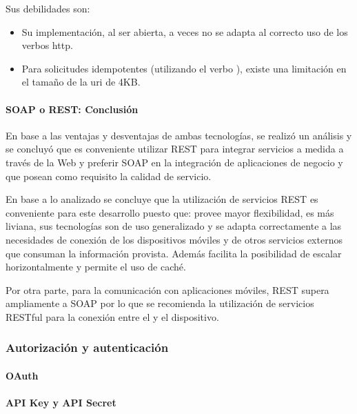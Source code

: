Sus debilidades son:
\begin{itemize}
\item Su implementación, al ser abierta, a veces no se adapta al correcto uso de los verbos \gls{http}.
\item Para solicitudes idempotentes (utilizando el verbo ), existe una limitación en el tamaño de la \gls{uri} de 4KB.
\end{itemize}

\paragraph{SOAP o REST: Conclusión}
\label{soap_vs_rest}

En base a las ventajas y desventajas de ambas tecnologías, se realizó un análisis\cite[p.~809]{pautasso2008restful} y se concluyó que es conveniente utilizar REST para integrar servicios a medida a través de la Web y preferir SOAP en la integración de aplicaciones de negocio y que posean como requisito la calidad de servicio.

En base a lo analizado se concluye que la utilización de servicios REST es conveniente para este desarrollo puesto que: provee mayor flexibilidad, es más liviana, sus tecnologías son de uso generalizado y se adapta correctamente a las necesidades de conexión de los dispositivos móviles y de otros servicios externos que consuman la información provista. Además facilita la posibilidad de escalar horizontalmente y permite el uso de caché.

Por otra parte, para la comunicación con aplicaciones móviles, REST supera ampliamente a SOAP por lo que se recomienda la utilización de servicios RESTful\cite{hamad2010performance} para la conexión entre el  y el dispositivo.

\subsubsection{Autorización y autenticación}
\label{autorizacion_autenticacion}

\paragraph{OAuth}
\label{oauth}

\paragraph{API Key y API Secret}
\label{apikey}
